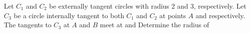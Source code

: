 Let $ C_1$ and $ C_2$ be externally tangent circles with radius 2 and 3, respectively. Let $ C_3$ be a circle internally tangent to both $ C_1$ and $ C_2$ at points $ A$ and  respectively. The tangents to $ C_3$ at $ A$ and $ B$ meet at  and  Determine the radius of 